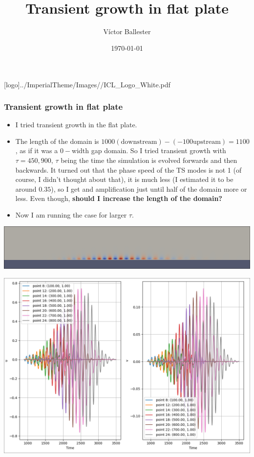 \documentclass[
  aspectratio=169, %
  t, %
  onlytextwidth, %
  10pt, %
]{beamer}
\title{Transient growth in flat plate} %
\subtitle{} %
\author{Víctor Ballester} %
\date{\today} %
\def\imagefolder{../ImperialTheme/Images/}
\begin{document}
\begingroup
{} %
[logo]{\imagefolder/ICL_Logo_White.pdf} %
\frame[plain, s]{\titlepage} %
\endgroup

\begin{frame}
	\frametitle{Transient growth in flat plate}
	\begin{itemize}
		\item I tried transient growth in the flat plate.
		\item The length of the domain is $1000 (\text{downstream}) - (-100 \text{upstream}) = 1100$, as if it was a $0-$width gap domain. So I tried transient growth with $\tau = 450, 900$, $\tau$ being the time the simulation is evolved forwards and then backwards. It turned out that the phase speed of the TS modes is not 1 (of course, I didn't thought about that), it is much less (I estimated it to be around $0.35$), so I get and amplification just until half of the domain more or less. Even though, \textbf{should I increase the length of the domain?}
		\item Now I am running the case for larger $\tau$.
	\end{itemize}
	\centering
	\includegraphics[width=0.85\linewidth]{Images/ts_tg.png}
\end{frame}
\begin{frame}
	\centering
	\includegraphics[width=0.75\linewidth]{Images/ts_tg_plot.png}
\end{frame}
\end{document}
